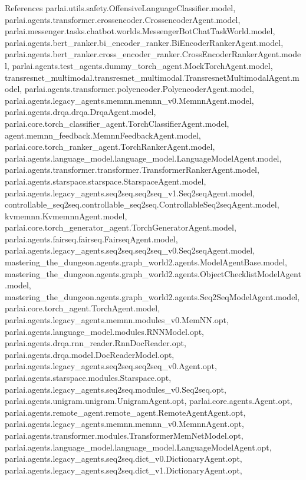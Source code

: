 References parlai.\+utils.\+safety.\+Offensive\+Language\+Classifier.\+model, parlai.\+agents.\+transformer.\+crossencoder.\+Crossencoder\+Agent.\+model, parlai.\+messenger.\+tasks.\+chatbot.\+worlds.\+Messenger\+Bot\+Chat\+Task\+World.\+model, parlai.\+agents.\+bert\+\_\+ranker.\+bi\+\_\+encoder\+\_\+ranker.\+Bi\+Encoder\+Ranker\+Agent.\+model, parlai.\+agents.\+bert\+\_\+ranker.\+cross\+\_\+encoder\+\_\+ranker.\+Cross\+Encoder\+Ranker\+Agent.\+model, parlai.\+agents.\+test\+\_\+agents.\+dummy\+\_\+torch\+\_\+agent.\+Mock\+Torch\+Agent.\+model, transresnet\+\_\+multimodal.\+transresnet\+\_\+multimodal.\+Transresnet\+Multimodal\+Agent.\+model, parlai.\+agents.\+transformer.\+polyencoder.\+Polyencoder\+Agent.\+model, parlai.\+agents.\+legacy\+\_\+agents.\+memnn.\+memnn\+\_\+v0.\+Memnn\+Agent.\+model, parlai.\+agents.\+drqa.\+drqa.\+Drqa\+Agent.\+model, parlai.\+core.\+torch\+\_\+classifier\+\_\+agent.\+Torch\+Classifier\+Agent.\+model, agent.\+memnn\+\_\+feedback.\+Memnn\+Feedback\+Agent.\+model, parlai.\+core.\+torch\+\_\+ranker\+\_\+agent.\+Torch\+Ranker\+Agent.\+model, parlai.\+agents.\+language\+\_\+model.\+language\+\_\+model.\+Language\+Model\+Agent.\+model, parlai.\+agents.\+transformer.\+transformer.\+Transformer\+Ranker\+Agent.\+model, parlai.\+agents.\+starspace.\+starspace.\+Starspace\+Agent.\+model, parlai.\+agents.\+legacy\+\_\+agents.\+seq2seq.\+seq2seq\+\_\+v1.\+Seq2seq\+Agent.\+model, controllable\+\_\+seq2seq.\+controllable\+\_\+seq2seq.\+Controllable\+Seq2seq\+Agent.\+model, kvmemnn.\+Kvmemnn\+Agent.\+model, parlai.\+core.\+torch\+\_\+generator\+\_\+agent.\+Torch\+Generator\+Agent.\+model, parlai.\+agents.\+fairseq.\+fairseq.\+Fairseq\+Agent.\+model, parlai.\+agents.\+legacy\+\_\+agents.\+seq2seq.\+seq2seq\+\_\+v0.\+Seq2seq\+Agent.\+model, mastering\+\_\+the\+\_\+dungeon.\+agents.\+graph\+\_\+world2.\+agents.\+Model\+Agent\+Base.\+model, mastering\+\_\+the\+\_\+dungeon.\+agents.\+graph\+\_\+world2.\+agents.\+Object\+Checklist\+Model\+Agent.\+model, mastering\+\_\+the\+\_\+dungeon.\+agents.\+graph\+\_\+world2.\+agents.\+Seq2\+Seq\+Model\+Agent.\+model, parlai.\+core.\+torch\+\_\+agent.\+Torch\+Agent.\+model, parlai.\+agents.\+legacy\+\_\+agents.\+memnn.\+modules\+\_\+v0.\+Mem\+N\+N.\+opt, parlai.\+agents.\+language\+\_\+model.\+modules.\+R\+N\+N\+Model.\+opt, parlai.\+agents.\+drqa.\+rnn\+\_\+reader.\+Rnn\+Doc\+Reader.\+opt, parlai.\+agents.\+drqa.\+model.\+Doc\+Reader\+Model.\+opt, parlai.\+agents.\+legacy\+\_\+agents.\+seq2seq.\+seq2seq\+\_\+v0.\+Agent.\+opt, parlai.\+agents.\+starspace.\+modules.\+Starspace.\+opt, parlai.\+agents.\+legacy\+\_\+agents.\+seq2seq.\+modules\+\_\+v0.\+Seq2seq.\+opt, parlai.\+agents.\+unigram.\+unigram.\+Unigram\+Agent.\+opt, parlai.\+core.\+agents.\+Agent.\+opt, parlai.\+agents.\+remote\+\_\+agent.\+remote\+\_\+agent.\+Remote\+Agent\+Agent.\+opt, parlai.\+agents.\+legacy\+\_\+agents.\+memnn.\+memnn\+\_\+v0.\+Memnn\+Agent.\+opt, parlai.\+agents.\+transformer.\+modules.\+Transformer\+Mem\+Net\+Model.\+opt, parlai.\+agents.\+language\+\_\+model.\+language\+\_\+model.\+Language\+Model\+Agent.\+opt, parlai.\+agents.\+legacy\+\_\+agents.\+seq2seq.\+dict\+\_\+v0.\+Dictionary\+Agent.\+opt, parlai.\+agents.\+legacy\+\_\+agents.\+seq2seq.\+dict\+\_\+v1.\+Dictionary\+Agent.\+opt, 